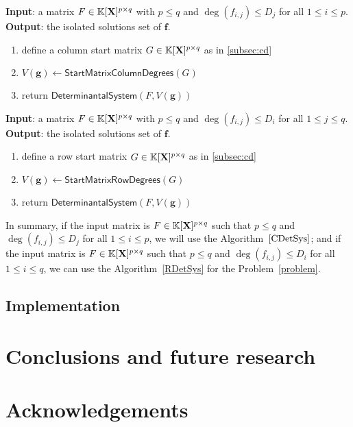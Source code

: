 \documentclass[11pt]{article}
\numberwithin{Property}{section}
\numberwithin{Theorem}{section}
\numberwithin{Proposition}{section}
\numberwithin{Lemma}{section}
\numberwithin{Corollary}{section}
\numberwithin{Definition}{section}
\numberwithin{Remark}{section}
\numberwithin{Conjecture}{section}
\numberwithin{Problem}{section}
\numberwithin{Claim}{section}
\theoremstyle{definition}
\numberwithin{Example}{section}
\def\f {\ensuremath{\mathbf{f}}}
\def\g {\ensuremath{\mathbf{g}}}
\renewcommand{\leq}{\leqslant}
\newcommand{\field}{\mathbb{K}} %
\newcommand{\mat}[1]{\mathbf{\MakeUppercase{#1}}} %
\begin{document}
\begin{algorithm}
\caption{$\mathsf{ColumnDeterminantal System}$}
\label{CDetSys}
{\bf Input}: a matrix $F \in \field[\mat{X}]^{p \times q}$ with $p \leq q$ and $\deg(f_{i,j}) \leq D_j$ for all $1 \leq i \leq p$.\\
{\bf Output}: the isolated solutions set of $\f$. 
\begin{enumerate}
\item define a column start matrix $G \in \field[\mat{X}]^{p \times q}$ as in \cref{subsec:cd}
\item $V(\g) \gets \mathsf{Start Matrix Column Degrees}(G)$
\item return $\mathsf{Determinantal System}(F, V(\g))$
\end{enumerate}
\end{algorithm}

\begin{algorithm}
\caption{$\mathsf{RowDeterminantal System}$}
\label{RDetSys}
{\bf Input}: a matrix $F \in \field[\mat{X}]^{p \times q}$ with $p \leq q$ and $\deg(f_{i,j}) \leq D_i$ for all $1 \leq j \leq q$.\\
{\bf Output}: the isolated solutions set of $\f$.
\begin{enumerate}
\item define a row start matrix $G \in \field[\mat{X}]^{p \times q}$ as in \cref{subsec:cd}
\item $V(\g) \gets \mathsf{Start Matrix Row Degrees}(G)$
\item return $\mathsf{Determinantal System}(F, V(\g))$
\end{enumerate}
\end{algorithm}


In summary, if the input matrix is $F \in \field[\mat{X}]^{p \times q}$ such that $p \leq q$ and $\deg(f_{i,j}) \leq D_j$ for all $1 \leq i \leq p$, we will use the Algorithm~$\ref{CDetSys}$; and if the input matrix is $F \in \field[\mat{X}]^{p \times q}$ such that $p \leq q$ and $\deg(f_{i,j}) \leq D_i$ for all $1 \leq i \leq q$, we can use the Algorithm~\ref{RDetSys} for the Problem~\ref{problem}.
\subsection{Implementation}
\section{Conclusions and future research}
\label{sec:conclusion}
\section{Acknowledgements}
\newpage


\appendix
\end{document}
